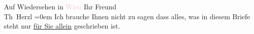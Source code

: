 \pstart
           Auf Wiedersehen in \textcolor{pink}{Wien}\ledrightnote{\textcolor{pink}{Wien}}{\\[\baselineskip]} Ihr Freund{\\[\baselineskip]}\spacefill\mbox{Th Herzl}\pend
           \leftskip=0em{}
\pstart
           \noindent{}Ich brauche Ihnen nicht zu sagen dass alles, was in diesem Briefe steht nur \uline{für Sie allein} geschrieben ist.\pend
           \endnumbering{}
\begin{anhang}
\end{anhang}
      